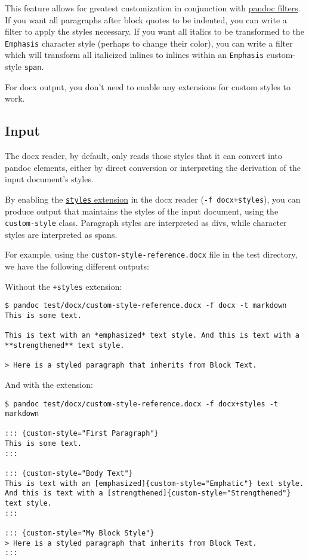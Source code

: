 \documentclass[]{article}
\begin{document}
This feature allows for greatest customization in conjunction with
\href{https://pandoc.org/filters.html}{pandoc filters}. If you want all
paragraphs after block quotes to be indented, you can write a filter to
apply the styles necessary. If you want all italics to be transformed to
the \texttt{Emphasis} character style (perhaps to change their color),
you can write a filter which will transform all italicized inlines to
inlines within an \texttt{Emphasis} custom-style \texttt{span}.

For docx output, you don't need to enable any extensions for custom
styles to work.

\hypertarget{input}{%
\subsection{Input}\label{input}}

The docx reader, by default, only reads those styles that it can convert
into pandoc elements, either by direct conversion or interpreting the
derivation of the input document's styles.

By enabling the \protect\hyperlink{ext-styles}{\texttt{styles}
extension} in the docx reader (\texttt{-f\ docx+styles}), you can
produce output that maintains the styles of the input document, using
the \texttt{custom-style} class. Paragraph styles are interpreted as
divs, while character styles are interpreted as spans.

For example, using the \texttt{custom-style-reference.docx} file in the
test directory, we have the following different outputs:

Without the \texttt{+styles} extension:

\begin{verbatim}
$ pandoc test/docx/custom-style-reference.docx -f docx -t markdown
This is some text.

This is text with an *emphasized* text style. And this is text with a
**strengthened** text style.

> Here is a styled paragraph that inherits from Block Text.
\end{verbatim}

And with the extension:

\begin{verbatim}
$ pandoc test/docx/custom-style-reference.docx -f docx+styles -t markdown

::: {custom-style="First Paragraph"}
This is some text.
:::

::: {custom-style="Body Text"}
This is text with an [emphasized]{custom-style="Emphatic"} text style.
And this is text with a [strengthened]{custom-style="Strengthened"}
text style.
:::

::: {custom-style="My Block Style"}
> Here is a styled paragraph that inherits from Block Text.
:::
\end{verbatim}
\end{document}
